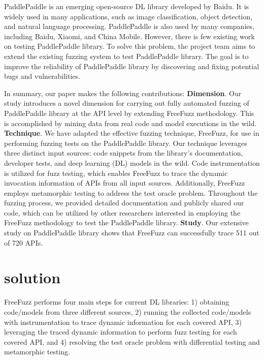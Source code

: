 \documentclass[sigconf]{acmart}
\begin{document}
PaddlePaddle is an emerging open-source DL library developed by Baidu\cite{p20}.
It is widely used in many applications, such as image classification, object detection, and natural language processing.
PaddlePaddle is also used by many companies, including Baidu, Xiaomi, and China Mobile.
However, there is few existing work on testing PaddlePaddle library. To solve this problem, the project team aims to extend the existing fuzzing system to test PaddlePaddle library. 
The goal is to improve the reliability of PaddlePaddle library by discovering and fixing potential bugs and vulnerabilities. 
 
In summary, our paper makes the following contributions:
\newline\textbf{Dimension}.  Our study introduces a novel dimension for carrying out fully automated fuzzing of PaddlePaddle library at the API level by extending FreeFuzz methodology. 
This is accomplished by mining data from real code and model executions in the wild.
\newline\textbf{Technique}. We have adapted the effective fuzzing technique, FreeFuzz, for use in performing fuzzing tests on the PaddlePaddle library. 
Our technique leverages three distinct input sources: code snippets from the library's documentation, developer tests, and deep learning (DL) models in the wild. 
Code instrumentation is utilized for fuzz testing, which enables FreeFuzz to trace the dynamic invocation information of APIs from all input sources. 
Additionally, FreeFuzz employs metamorphic testing to address the test oracle problem. Throughout the fuzzing process, we provided detailed documentation and publicly shared our code, 
which can be utilized by other researchers interested in employing the FreeFuzz methodology to test the PaddlePaddle library.
\newline\textbf{Study}. Our extensive study on PaddlePaddle library shows that FreeFuzz can successfully trace 511 out of 720 APIs.



\section{solution}
FreeFuzz performs four main steps for current DL libraries: 1) obtaining code/models from three different sources, 2) running the collected code/models with instrumentation to trace dynamic information for each covered API, 3) leveraging the traced dynamic information to perform fuzz testing for each covered API, and 4) resolving the test oracle problem with differential testing and metamorphic testing.
\end{document}
